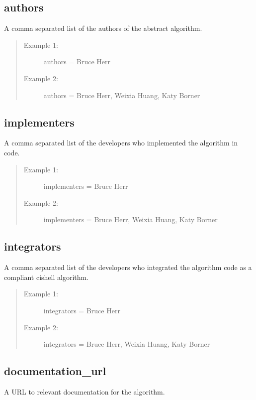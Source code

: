 \subsection*{authors}
A comma separated list of the authors of the abstract algorithm.

\begin{quote}
\begin{description}
  \item[Example 1:] authors = Bruce Herr
  \item[Example 2:] authors = Bruce Herr, Weixia Huang, Katy Borner 
\end{description}
\end{quote}


\subsection*{implementers}
A comma separated list of the developers who implemented the algorithm in code.

\begin{quote}
\begin{description}
  \item[Example 1:] implementers = Bruce Herr
  \item[Example 2:] implementers = Bruce Herr, Weixia Huang, Katy Borner 
\end{description}
\end{quote}


\subsection*{integrators}
A comma separated list of the developers who integrated the algorithm code as
a compliant cishell algorithm.

\begin{quote}
\begin{description}
  \item[Example 1:] integrators = Bruce Herr
  \item[Example 2:] integrators = Bruce Herr, Weixia Huang, Katy Borner 
\end{description}
\end{quote}


\subsection*{documentation\_url}
A URL to relevant documentation for the algorithm.

